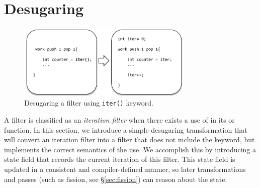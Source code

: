 \section{Desugaring}
\label{sec:desugar}

%
%
%
%
%
%
%
%
%
%


\begin{figure}[t!]
\centering
\includegraphics[width=3.3in]{figures/desugaring_filters.pdf}
\caption{Desugaring a filter using \texttt{iter()} keyword.\protect\label{fig:desugar}}
\end{figure}


A filter is classified as an {\it iteration filter} when there exists a use of
\iter in its \prework or \work function.  In this section, we
introduce a simple desugaring transformation that will convert an
iteration filter into a filter that does not include the \iter
keyword, but implements the correct semantics of the \iter use.  We
accomplish this by introducing a state field that records the current
iteration of this filter.  This state field is updated in a consistent
and compiler-defined manner, so later transformations and passes (such
as fission, see \S\ref{sec:fission}) can reason about the
state.  

